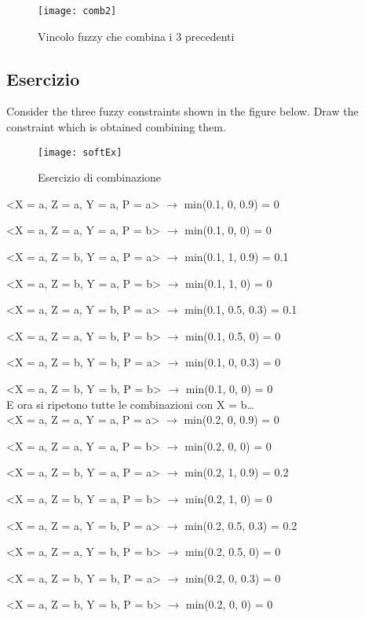 \begin{figure}[H]
\centering
\texttt{[image: comb2]}
\caption{Vincolo fuzzy che combina i 3 precedenti}
\label{fig:comb2}
\end{figure}

\subsection{Esercizio}

Consider the three fuzzy constraints shown in the figure below.
Draw the constraint which is obtained combining them.

\begin{figure}[H]
\centering
\texttt{[image: softEx]}
\caption{Esercizio di combinazione}
\label{fig:comb2}
\end{figure}

<X = a, Z = a, Y = a, P = a> $\rightarrow$ min(0.1, 0, 0.9) = 0

<X = a, Z = a, Y = a, P = b> $\rightarrow$ min(0.1, 0, 0) = 0

<X = a, Z = b, Y = a, P = a> $\rightarrow$ min(0.1, 1, 0.9) = 0.1

<X = a, Z = b, Y = a, P = b> $\rightarrow$ min(0.1, 1, 0) = 0

<X = a, Z = a, Y = b, P = a> $\rightarrow$ min(0.1, 0.5, 0.3) = 0.1

<X = a, Z = a, Y = b, P = b> $\rightarrow$ min(0.1, 0.5, 0) = 0

<X = a, Z = b, Y = b, P = a> $\rightarrow$ min(0.1, 0, 0.3) = 0

<X = a, Z = b, Y = b, P = b> $\rightarrow$ min(0.1, 0, 0) = 0\\

E ora si ripetono tutte le combinazioni con X = b\dots\\

<X = a, Z = a, Y = a, P = a> $\rightarrow$ min(0.2, 0, 0.9) = 0

<X = a, Z = a, Y = a, P = b> $\rightarrow$ min(0.2, 0, 0) = 0

<X = a, Z = b, Y = a, P = a> $\rightarrow$ min(0.2, 1, 0.9) = 0.2

<X = a, Z = b, Y = a, P = b> $\rightarrow$ min(0.2, 1, 0) = 0

<X = a, Z = a, Y = b, P = a> $\rightarrow$ min(0.2, 0.5, 0.3) = 0.2

<X = a, Z = a, Y = b, P = b> $\rightarrow$ min(0.2, 0.5, 0) = 0

<X = a, Z = b, Y = b, P = a> $\rightarrow$ min(0.2, 0, 0.3) = 0

<X = a, Z = b, Y = b, P = b> $\rightarrow$ min(0.2, 0, 0) = 0
